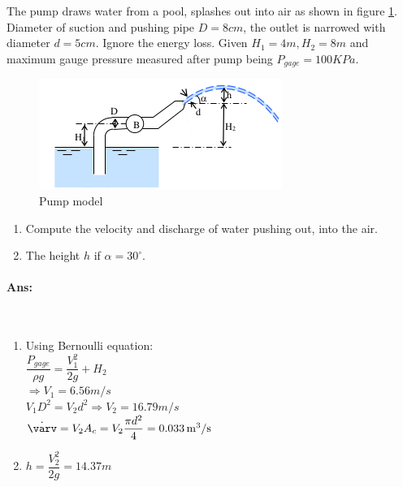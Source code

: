 \section{}
\section{}
\section{}
The pump draws water from a pool, splashes out into air as shown in figure \ref{fig:2020-09-02}. Diameter of suction and pushing pipe $ D = 8\unit{cm }$, the outlet is narrowed with diameter $ d = 5\unit{cm} $. Ignore the energy loss. Given $ H_1 = 4\unit{m}, H_2 = 8\unit{m} $ and maximum gauge pressure measured after pump being $ P_{gage}=100\unit{KPa} $.
\begin{figure}[h]
	\centering
	\includegraphics[width=0.4\linewidth]{"Screenshot_2020-09-02_09-42-19"}
	\caption{Pump model}
	\label{fig:2020-09-02}
\end{figure}
\begin{enumerate}
	\item Compute the velocity and discharge of water pushing out, into the air.
	\item The height $ h $ if $ \alpha = 30^\circ $.
\end{enumerate}
\paragraph{Ans:}$ $
\begin{enumerate}
	\item Using Bernoulli equation:\\
	$ \dfrac{P_{gage}}{\rho g} = \dfrac{V_1^2}{2g}+H_2 $\\
	$ \Rightarrow V_1 = 6.56\unit{m/s} $\\
	$ V_1D^2 = V_2d^2\Rightarrow V_2 = 16.79\unit{m/s} $\\
	$ \dot{\varv} = V_2A_c = V_2\dfrac{\pi d^2}{4} = 0.033\unit{m^3/s}$
	\item $ h = \dfrac{V_2^2}{2g} = 14.37\unit{m} $
\end{enumerate}

\section{}
\section{}
\section{}
\section{}
\section{}
\section{}
